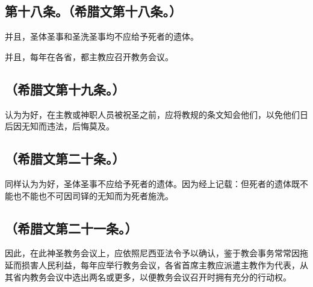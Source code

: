 \subsection{第十八条。（希腊文第十八条。）}

\par

并且，圣体圣事和圣洗圣事均不应给予死者的遗体。\par

并且，每年在各省，都主教应召开教务会议。\par


\subsection{（希腊文第十九条。）}

认为为好，在主教或神职人员被祝圣之前，应将教规的条文知会他们，以免他们日后因无知而违法，后悔莫及。\par


\subsection{（希腊文第二十条。）}

同样认为为好，圣体圣事不应给予死者的遗体。因为经上记载：但死者的遗体既不能也不能也不可因司铎的无知而为死者施洗。\par


\subsection{（希腊文第二十一条。）}

因此，在此神圣教务会议上，应依照尼西亚法令予以确认，鉴于教会事务常常因拖延而损害人民利益，每年应举行教务会议，各省首席主教应派遣主教作为代表，从其省内教务会议中选出两名或更多，以便教务会议召开时拥有充分的行动权。\par


